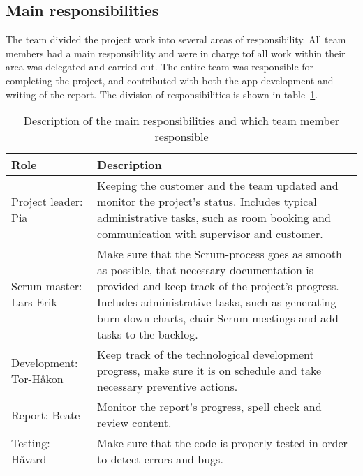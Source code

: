 \subsection{Main responsibilities}
\label{sec:mainresp}
The team divided the project work into several areas of responsibility. All team members had a main responsibility and were in charge tof all work within their area was delegated and carried out. The entire team was responsible for completing the project, and contributed with both the app development and writing of the report. The division of responsibilities is shown in table~\ref{tab:mainResponsibilities}.


\begin{table}[H]
\centering
{}
\begin{tabular}{|l|p{11.2cm}|}
\hline
\textbf{Role} & \textbf{Description}\\\hline
Project leader: Pia & Keeping the customer and the team updated and monitor the project's status. Includes typical administrative tasks, such as room booking and communication with supervisor and customer.\\\hline
Scrum-master: Lars Erik & Make sure that the Scrum-process goes as smooth as possible, that necessary documentation is provided and keep track of the project's progress. Includes administrative tasks, such as generating burn down charts, chair Scrum meetings and add tasks to the backlog.\\\hline
Development: Tor-Håkon & Keep track of the technological development progress, make sure it is on schedule and take necessary preventive actions.\\\hline
Report: Beate & Monitor the report's progress, spell check and review content.\\\hline
Testing: Håvard & Make sure that the code is properly tested in order to detect errors and bugs. \\\hline
\end{tabular}
\caption{Description of the main responsibilities and which team member responsible}
\label{tab:mainResponsibilities}
\end{table}
